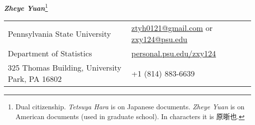 \documentclass[utf8,letterpaper,oneside]{article}
\begin{document}
\noindent  \textit{\large\textbf{Zheye Yuan}}\footnote{Dual citizenship. \textit{Tetsuya Hara} is on Japanese documents. \textit{Zheye Yuan} is on American documents (used in graduate school). In characters it is {\setmainfont{kaiu.ttf} 原晣也}.}
\small
\begin{center}
 \begin{tabular}{l l}
  Pennsylvania State University                  & \hspace{1in} \href{mailto:ztyh0121@gmail.com}{ztyh0121@gmail.com} or \href{mailto:zxy124@psu.edu}{zxy124@psu.edu} \\
  Department of Statistics                       & \hspace{1in}   \href{http://personal.psu.edu/zxy124/}{personal.psu.edu/zxy124}                                    \\
  325 Thomas Building, University Park, PA 16802 & \hspace{1in}+1 (814) 883-6639                                                                                     \\
 \end{tabular}
\end{center}
\noindent
\end{document}
